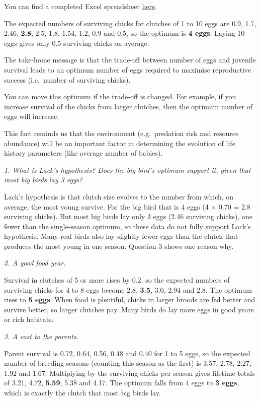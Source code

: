 \documentclass[
  a4paper]{book}
\begin{document}
You can find a completed Excel spreadsheet \href{https://www.dropbox.com/scl/fi/c6f1j0g8yoqx2c5o8m98k/How_Many_Eggs_Answers.xlsx?rlkey=ru8jhmcfaxa33ijqgqo6etpu5&dl=0}{here}.

The expected numbers of surviving chicks for clutches of 1 to 10 eggs are 0.9, 1.7, 2.46, \textbf{2.8}, 2.5, 1.8, 1.54, 1.2, 0.9 and 0.5, so the optimum is \textbf{4 eggs}. Laying 10 eggs gives only 0.5 surviving chicks on average.

The take-home message is that the trade-off between number of eggs and juvenile survival leads to an optimum number of eggs required to maximise reproductive success (i.e.~number of surviving chicks).

You can move this optimum if the trade-off is changed. For example, if you increase survival of the chicks from larger clutches, then the optimum number of eggs will increase.

This fact reminds us that the environment (e.g.~predation risk and resource abundance) will be an important factor in determining the evolution of life history parameters (like average number of babies).

\emph{1. What is Lack's hypothesis? Does the big bird's optimum support it, given that most big birds lay 3 eggs?}

Lack's hypothesis is that clutch size evolves to the number from which, on average, the most young survive. For the big bird that is 4 eggs (4 × 0.70 = 2.8 surviving chicks). But most big birds lay only 3 eggs (2.46 surviving chicks), one fewer than the single-season optimum, so these data do not fully support Lack's hypothesis. Many real birds also lay slightly fewer eggs than the clutch that produces the most young in one season. Question 3 shows one reason why.

\emph{2. A good food year.}

Survival in clutches of 5 or more rises by 0.2, so the expected numbers of surviving chicks for 4 to 8 eggs become 2.8, \textbf{3.5}, 3.0, 2.94 and 2.8. The optimum rises to \textbf{5 eggs}. When food is plentiful, chicks in larger broods are fed better and survive better, so larger clutches pay. Many birds do lay more eggs in good years or rich habitats.

\emph{3. A cost to the parents.}

Parent survival is 0.72, 0.64, 0.56, 0.48 and 0.40 for 1 to 5 eggs, so the expected number of breeding seasons (counting this season as the first) is 3.57, 2.78, 2.27, 1.92 and 1.67. Multiplying by the surviving chicks per season gives lifetime totals of 3.21, 4.72, \textbf{5.59}, 5.38 and 4.17. The optimum falls from 4 eggs to \textbf{3 eggs}, which is exactly the clutch that most big birds lay.
\end{document}
